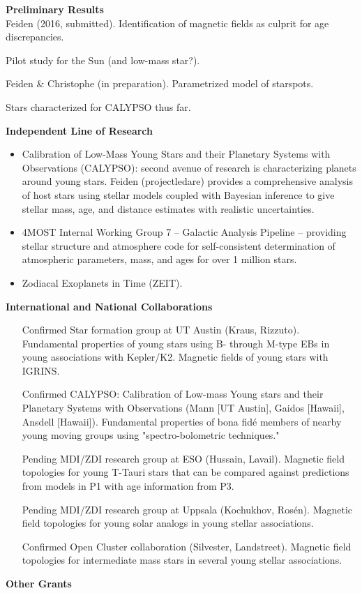 \documentclass[12pt,a4paper]{article}
\begin{document}
{\bf \large Preliminary Results} \\
Feiden (2016, submitted). Identification of magnetic fields as culprit for age discrepancies.

Pilot study for the Sun (and low-mass star?).

Feiden \& Christophe (in preparation). Parametrized model of starspots.

Stars characterized for CALYPSO thus far.

{\bf \large Independent Line of Research}
\begin{itemize}
	\item Calibration of Low-Mass Young Stars and their Planetary Systems with Observations (CALYPSO): 
	second avenue of research is characterizing planets around young stars. 
    Feiden (projectledare) provides a comprehensive analysis of host stars using stellar models coupled 
    with Bayesian inference
    to give stellar mass, age, and distance estimates with realistic uncertainties.
	\item 4MOST Internal Working Group 7 -- Galactic Analysis Pipeline -- providing stellar
    structure and atmosphere code for self-consistent determination of atmospheric 
    parameters, mass, and ages for over 1 million stars.
    \item Zodiacal Exoplanets in Time (ZEIT).
\end{itemize}

{\bf \large International and National Collaborations}
\begin{itemize}
  	\item [Confirmed] Star formation group at UT Austin (Kraus, Rizzuto). Fundamental properties of young stars using B- through M-type EBs in young associations with Kepler/K2. Magnetic fields of young stars with IGRINS.
  	\item [Confirmed] CALYPSO: Calibration of Low-mass Young stars and their Planetary Systems with Observations (Mann [UT Austin], Gaidos [Hawaii], Ansdell [Hawaii]). Fundamental properties of bona fid\'{e} members of nearby young moving groups using "spectro-bolometric techniques."
  	\item [Pending] MDI/ZDI research group at ESO (Hussain, Lavail). Magnetic field topologies for young T-Tauri stars that can be compared against predictions from models in P1 with age information from P3.
  	\item [Pending] MDI/ZDI research group at Uppsala (Kochukhov, Ros\'{e}n). Magnetic field topologies for young solar analogs in young stellar associations.
  	\item [Confirmed] Open Cluster collaboration (Silvester, Landstreet). Magnetic field topologies for intermediate mass stars in several young stellar associations.
\end{itemize}


{\bf \large Other Grants}

\scriptsize 

\end{document}
